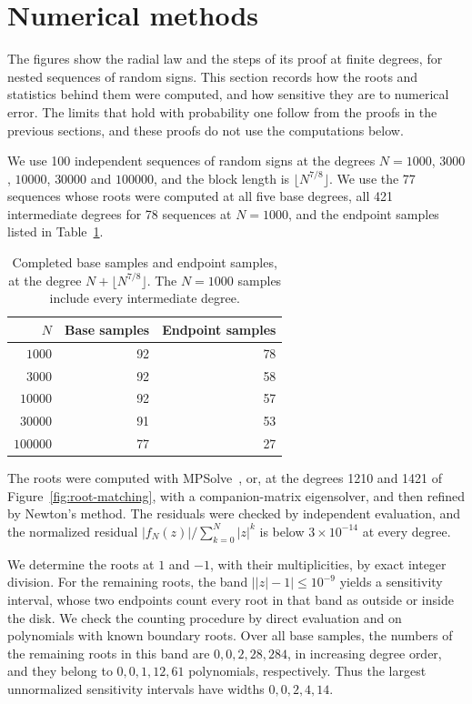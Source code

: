 \section{Numerical methods}\label{sec:numerics}
The figures show the radial law and the steps of its proof at finite
degrees, for nested sequences of random signs. This section records how
the roots and statistics behind them were computed, and how sensitive
they are to numerical error.
The limits that hold with probability one follow from the proofs in the
previous sections, and these proofs do not use the computations below.

We use 100 independent sequences of random signs at the degrees
$N=1000$, $3000$, $10000$, $30000$ and $100000$, and the block length is
$\lfloor N^{7/8}\rfloor$.
We use the 77 sequences whose roots were computed at all five base
degrees, all 421 intermediate degrees for 78 sequences at $N=1000$, and
the endpoint samples listed in Table~\ref{tab:numerical-coverage}.

\begin{table}[htbp]
\centering
\begin{tabular}{rrr}
\toprule
$N$ & Base samples & Endpoint samples\\
\midrule
$1000$ & 92 & 78\\
$3000$ & 92 & 58\\
$10000$ & 92 & 57\\
$30000$ & 91 & 53\\
$100000$ & 77 & 27\\
\bottomrule
\end{tabular}
\caption{Completed base samples and endpoint samples, at the degree
$N+\lfloor N^{7/8}\rfloor$. The $N=1000$ samples include every
intermediate degree.}
\label{tab:numerical-coverage}
\end{table}

The roots were computed with MPSolve~\cite{BiniRobol2014}, or, at the
degrees 1210 and 1421 of Figure~\ref{fig:root-matching}, with a
companion-matrix eigensolver, and then refined by Newton's method.
The residuals were checked by independent evaluation, and the normalized
residual $|f_N(z)|/\sum_{k=0}^N|z|^k$ is below $3\times10^{-14}$ at every
degree.

We determine the roots at $1$ and $-1$, with their multiplicities, by exact
integer division.
For the remaining roots, the band $\bigl||z|-1\bigr|\le10^{-9}$ yields a
sensitivity interval, whose two endpoints count every root in that band as
outside or inside the disk.
We check the counting procedure by direct evaluation and on polynomials
with known boundary roots.
Over all base samples, the numbers of the remaining roots in this band
are $0,0,2,28,284$, in increasing degree order, and they belong to
$0,0,1,12,61$ polynomials, respectively.
Thus the largest unnormalized sensitivity intervals have widths $0,0,2,4,14$.

